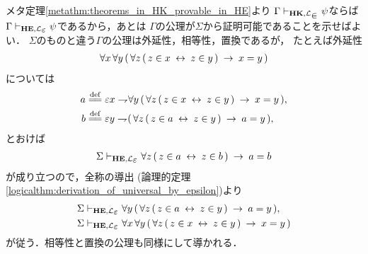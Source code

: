 	\begin{metaprf}
		メタ定理\ref{metathm:theorems_in_HK_provable_in_HE}より
		$\Gamma \provable{\mbox{{\bf HK}},\lang{\in}} \psi$ならば
		$\Gamma \provable{\mbox{{\bf HE}},\lang{\varepsilon}} \psi$であるから，あとは
		$\Gamma$の公理が$\Sigma$から証明可能であることを示せばよい．
		$\Sigma$のものと違う$\Gamma$の公理は外延性，相等性，置換であるが，
		たとえば外延性
		\begin{align}
			\forall x\, \forall y\, (\, \forall z\, 
			(\, z \in x \hspace{0.25em}\leftrightarrow\hspace{0.25em} z \in y\, ) \hspace{0.25em}\rightarrow\hspace{0.25em} x = y\, )
		\end{align}
		については
		\begin{align}
			a &\defeq \varepsilon x \negation \forall y\, (\, \forall z\, 
			(\, z \in x \lrarrow z \in y\, ) \rarrow x = y\, ), \\
			b &\defeq \varepsilon y \negation (\, \forall z\, 
			(\, z \in a \lrarrow z \in y\, ) \rarrow a = y\, ),
		\end{align}
		とおけば
		\begin{align}
			\Sigma \provable{\mbox{{\bf HE}},\lang{\varepsilon}} \forall z\, (\, z \in a \lrarrow z \in b\, ) \rarrow a = b
		\end{align}
		が成り立つので，全称の導出
		(論理的定理\ref{logicalthm:derivation_of_universal_by_epsilon})より
		\begin{align}
			\Sigma &\provable{\mbox{{\bf HE}},\lang{\varepsilon}} \forall y\, (\, \forall z\, 
			(\, z \in a \lrarrow z \in y\, ) \rarrow a = y\, ), \\
			\Sigma &\provable{\mbox{{\bf HE}},\lang{\varepsilon}} \forall x\, \forall y\, (\, \forall z\, 
			(\, z \in x \lrarrow z \in y\, ) \rarrow x = y\, )
		\end{align}
		が従う．相等性と置換の公理も同様にして導かれる．
		\QED
	\end{metaprf}